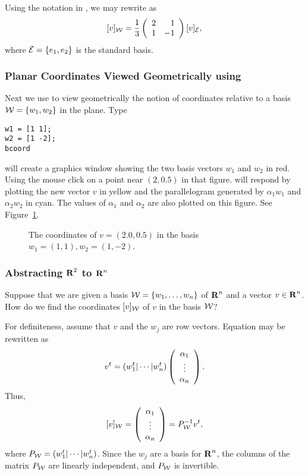Using the notation in , we may rewrite  as
\[
[v]_{\cal W} = \frac{1}{3}\left(\begin{array}{rr} 2 & 1\\ 1 &-1\end{array}\right) [v]_{\cal E},
\]
where ${\cal E} = \{e_1,e_2\}$ is the standard basis.

\subsubsection*{Planar Coordinates Viewed Geometrically using \Matlab}

Next we use \Matlab to view geometrically the notion of coordinates
relative to a basis ${\cal W}=\{w_1,w_2\}$ in the plane.  Type
\begin{verbatim}
w1 = [1 1];
w2 = [1 -2];
bcoord
\end{verbatim} 
\Matlab will create a graphics window showing the two basis vectors
$w_1$ and $w_2$ in red.  Using the mouse click on a point near
$(2,0.5)$ in that figure.  \Matlab will respond by plotting the
new vector $v$ in yellow and the parallelogram generated by
$\alpha_1w_1$ and $\alpha_2w_2$ in cyan.  The values of $\alpha_1$
and $\alpha_2$ are also plotted on this figure.  See
Figure~\ref{F:coords}.

\begin{figure}[htb]
     \centerline{%
     }
     \caption{The coordinates of $v=(2.0,0.5)$ in the basis
	$w_1=(1,1), w_2=(1,-2)$.}
     \label{F:coords}
\end{figure}

\subsubsection*{Abstracting $\mbox{$\bf{R}$}^2$ to $\mbox{$\bf{R}$}^n$}

Suppose that we are given a basis ${\cal W} = \{w_1,\ldots,w_n\}$ of
$\mbox{$\bf{R}$}^n$ and a vector $v\in\mbox{$\bf{R}$}^n$.  How do we find the coordinates
$[v]_{\cal W}$ of $v$ in the basis ${\cal W}$?

For definiteness, assume that $v$ and the $w_j$ are row vectors.  Equation
 may be rewritten as
\[
v^t = (w_1^t|\cdots|w_n^t)\left(\begin{array}{c} \alpha_1 \\ \vdots \\ \alpha_{n}\end{array}\right).
\]
Thus,
\begin{equation}  \label{e:coordRn}
[v]_{\cal W} = \left(\begin{array}{c} \alpha_1 \\ \vdots \\ \alpha_{n}\end{array}\right) = P_{\cal W}^{-1} v^t,
\end{equation}
where $P_{\cal W} = (w_1^t|\cdots|w_n^t)$.  Since the $w_j$ are a basis for
$\mbox{$\bf{R}$}^n$, the columns of the matrix $P_{\cal W}$ are linearly independent, and
$P_{\cal W}$ is invertible.


